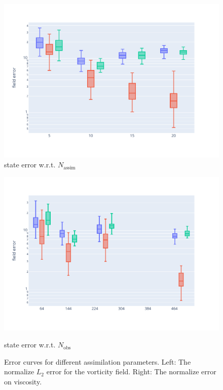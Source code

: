 \begin{figure}[htbp]
	\centering
	\includegraphics[width=\linewidth]{./images/app2d/MSE_na_box.pdf}
	\captionsetup{labelformat=empty}
	\caption{state error w.r.t. $N_{\text{assim}}$}
	\label{fig:na}
\end{figure}

\begin{figure}[htbp]
	\captionsetup{labelformat=empty}
	\centering
	\includegraphics[width=\linewidth]{./images/app2d/MSE_nobs_box.pdf}
	\caption{state error w.r.t. $N_{\text{obs}}$}
	\label{fig:nobs}
	\caption{Error curves for different assimilation parameters. Left: The normalize $L_2$ error for the vorticity field. Right: The normalize error on viscosity.}
	\label{fig:assim_params}
\end{figure}

